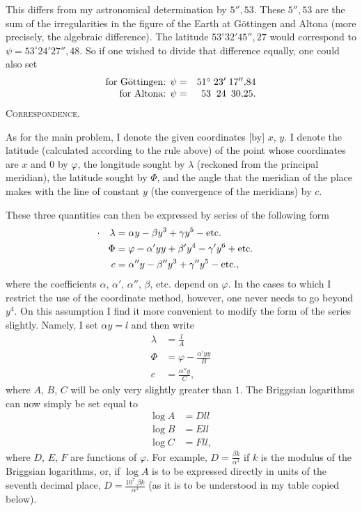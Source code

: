 This differs from my astronomical determination by $5''{,}53$. These $5''{,}53$ are the sum of the irregularities in the figure of the Earth at Göttingen and Altona (more precisely, the algebraic difference). The latitude $53^\circ32'45''{,}27$ would correspond to $\psi=53^\circ24'27''{,}48$. So if one wished to divide that difference equally, one could also set
\[
\begin{array}{r@{\quad}r@{\;}r@{\;}r}
\text{for Göttingen: }\psi=&51^\circ&23'&17''{,}84\\
\text{for Altona: }\psi=&53&24&30{,}25.
\end{array}
\]
\clearpage
{}\hfill\textsc{Correspondence.}\hfill\mbox{}\par\medskip
As for the main problem, I denote the given coordinates [by] $x$, $y$. I denote the latitude (calculated according to the rule above) of the point whose coordinates are $x$ and $0$ by $\varphi$, the longitude sought by $\lambda$ (reckoned from the principal meridian), the latitude sought by $\Phi$, and the angle that the meridian of the place makes with the line of constant $y$ (the convergence of the meridians) by $c$.

These three quantities can then be expressed by series of the following form
\[
\begin{aligned}
\llap{\text{\raisebox{.45ex}{.}\hspace{1em}}}\lambda&=\alpha y-\beta y^3+\gamma y^5-\text{etc.}\\
\Phi&=\varphi-\alpha'yy+\beta'y^4-\gamma'y^6+\text{etc.}\\
c&=\alpha''y-\beta''y^3+\gamma''y^5-\text{etc.},
\end{aligned}
\]
where the coefficients $\alpha$, $\alpha'$, $\alpha''$, $\beta$, etc. depend on $\varphi$. In the cases to which I restrict the use of the coordinate method, however, one never needs to go beyond $y^4$. On this assumption I find it more convenient to modify the form of the series slightly. Namely, I set $\alpha y=l$ and then write
\[
\begin{aligned}
\lambda&=\frac lA\\
\Phi&=\varphi-\frac{\alpha'yy}{B}\\
c&=\frac{\alpha''y}{C},
\end{aligned}
\]
where $A$, $B$, $C$ will be only very slightly greater than $1$. The Briggsian logarithms can now simply be set equal to
\[
\begin{aligned}
\log A&=Dll\\
\log B&=Ell\\
\log C&=Fll,
\end{aligned}
\]
where $D$, $E$, $F$ are functions of $\varphi$. For example, $D=\frac{\beta k}{\alpha^3}$ if $k$ is the modulus of the Briggsian logarithms, or, if $\log A$ is to be expressed directly in units of the seventh decimal place, $D=\frac{10^7.\beta k}{\alpha^3}$ (as it is to be understood in my table copied below).

